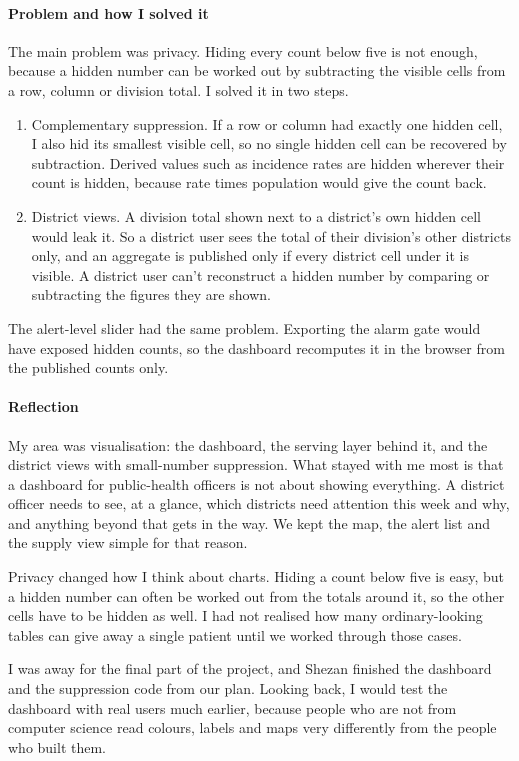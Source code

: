 \paragraph*{Problem and how I solved it} The main problem was privacy. Hiding every count below five is not enough,
because a hidden number can be worked out by subtracting the visible cells from a row, column or division total.
I solved it in two steps.
\begin{enumerate}
\item Complementary suppression. If a row or column had exactly one hidden cell, I also hid its smallest visible
cell, so no single hidden cell can be recovered by subtraction. Derived values such as incidence rates are hidden
wherever their count is hidden, because rate times population would give the count back.
\item District views. A division total shown next to a district's own hidden cell would leak it. So a district user
sees the total of their division's other districts only, and an aggregate is published only if every district cell
under it is visible. A district user can't reconstruct a hidden number by comparing or subtracting the figures they
are shown.
\end{enumerate}
The alert-level slider had the same problem. Exporting the alarm gate would have exposed hidden counts, so the
dashboard recomputes it in the browser from the published counts only.

\paragraph*{Reflection} My area was visualisation: the dashboard, the serving layer behind it, and the district views with small-number
suppression. What stayed with me most is that a dashboard for public-health officers is not about showing
everything. A district officer needs to see, at a glance, which districts need attention this week and why, and
anything beyond that gets in the way. We kept the map, the alert list and the supply view simple for that reason.

Privacy changed how I think about charts. Hiding a count below five is easy, but a hidden number can often be
worked out from the totals around it, so the other cells have to be hidden as well. I had not realised how many
ordinary-looking tables can give away a single patient until we worked through those cases.

I was away for the final part of the project, and Shezan finished the dashboard and the suppression code from our
plan. Looking back, I would test the dashboard with real users much earlier, because people who are not from
computer science read colours, labels and maps very differently from the people who built them.

